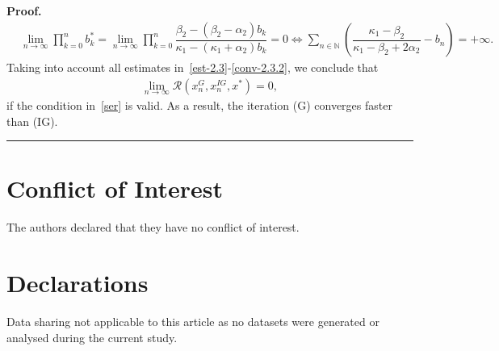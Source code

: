 \documentclass[a4paper, 11pt]{article}
\newenvironment{proof}[1][Proof]{\textbf{#1.} }{\hfill\rule{0.5em}{0.5em}}
\begin{document}
\begin{proof}
\begin{align}
	&\lim\limits_{n\to \infty}\prod_{k=0}^n b^*_k=\lim\limits_{n\to \infty}\prod_{k=0}^n \dfrac{\beta_2-(\beta_2-\alpha_2)b_k}{\kappa_1-(\kappa_1+\alpha_2)b_k}=0\Leftrightarrow \displaystyle\sum_{n \in \mathbb{N}}\left(\dfrac{\kappa_1-\beta_2}{\kappa_1-\beta_2+2\alpha_2}-b_n\right)=+\infty.\label{conv-2.3.2}
\end{align}
Taking into account all estimates in~\eqref{est-2.3}-\eqref{conv-2.3.2}, we conclude that  
\begin{align*}
	\lim\limits_{n\to \infty} \mathcal{R}(x_n^G,x_n^{IG},x^*) =0,
\end{align*}
if the condition in~\eqref{ser} is valid. As a result, the iteration (G) converges faster than (IG).
\end{proof}

\section*{Conflict of Interest}
The authors declared that they have no conflict of interest.

\section*{Declarations}
Data sharing not applicable to this article as no datasets were generated or analysed during the current study.
\end{document}
